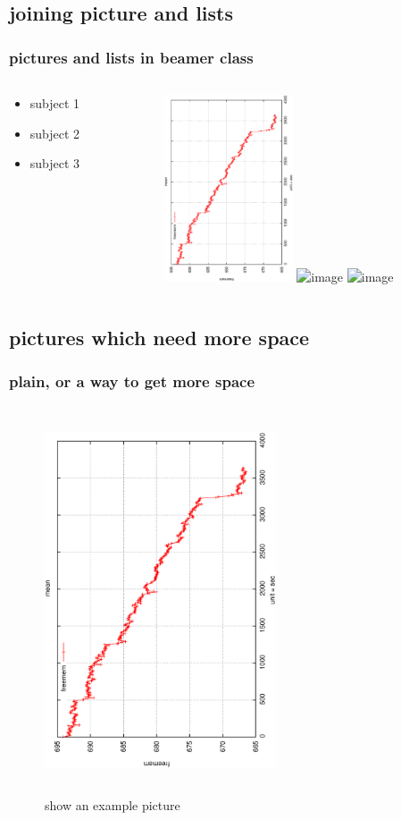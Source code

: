 \documentclass{beamer}
\begin{document}
\subsection{joining picture and lists}

\begin{frame}
  \frametitle{pictures and lists in beamer class}
  \begin{columns}
    \begin{column}{4cm}
      \begin{itemize}
        \item<1-> subject 1
        \item<3-> subject 2
        \item<5-> subject 3
      \end{itemize}
      \vspace{3cm}
    \end{column}
    \begin{column}{5cm}
      \begin{overprint}
        \includegraphics<2>[width=1.5in, angle=-90]{figs/PIC1}
        \includegraphics<4>[width=1.5in, angle=-90]{figs/PIC2}
        \includegraphics<6>[width=1.5in, angle=-90]{figs/PIC3}
      \end{overprint}
    \end{column}
  \end{columns}
\end{frame}

\subsection{pictures which need more space}

\begin{frame}[plain]
  \frametitle{plain, or a way to get more space}
  \begin{figure}
    \includegraphics[width=2.7in, height=4.5in, angle=-90]{figs/PIC1}
    \caption{show an example picture}
  \end{figure}
\end{frame}
\end{document}
